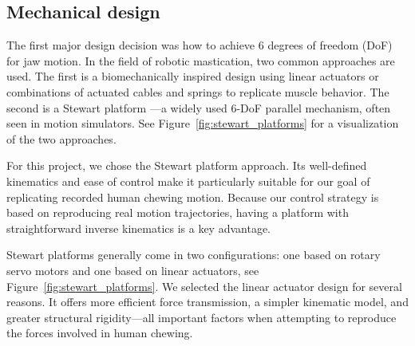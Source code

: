 \subsection{Mechanical design}

The first major design decision was how to achieve 6 degrees of freedom (DoF) for jaw motion. In the field of robotic mastication, two common approaches 
are used. The first is a biomechanically inspired design using linear actuators \cite{ChewingRobotLinearActuator} or combinations of actuated cables and 
springs \cite{ChewingRobotGums} to replicate muscle behavior. The second is a Stewart platform \cite{BristolChewingRobot}—a widely used 6-DoF parallel mechanism, often seen in 
motion simulators. See Figure~\ref{fig:stewart_platforms} for a visualization of the two approaches.

For this project, we chose the Stewart platform approach. Its well-defined kinematics and ease of control make it particularly suitable for our goal of 
replicating recorded human chewing motion. Because our control strategy is based on reproducing real motion trajectories, having a platform with 
straightforward inverse kinematics is a key advantage.

Stewart platforms generally come in two configurations: one based on rotary servo motors and one based on linear actuators, see Figure~\ref{fig:stewart_platforms}. 
We selected the linear actuator design for several reasons. It offers more efficient force transmission, a simpler kinematic model, and greater structural 
rigidity—all important factors when attempting to reproduce the forces involved in human chewing.

